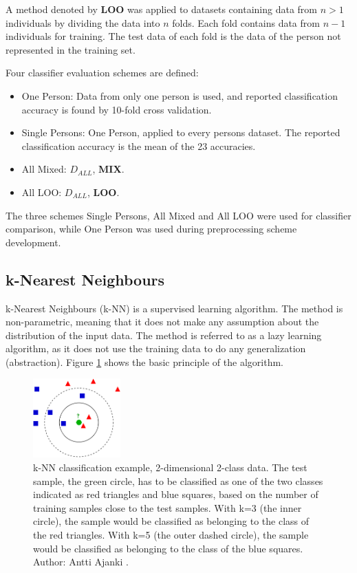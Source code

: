 A method denoted by \textbf{LOO} was applied to datasets
containing data from \(n>1\) individuals by dividing
the data into \(n\) folds. Each fold contains data from \(n-1\)
individuals for training. The test data of each fold is the
data of the person not represented in the training set.

Four classifier evaluation schemes are defined:
\begin{itemize}
\item One Person:
Data from only one person is used,
and reported classification accuracy is found by 10-fold cross validation.
\item Single Persons:
One Person, applied to every persons dataset. The reported
classification accuracy is the mean of the 23 accuracies.
\item All Mixed:
\(D_{ALL}\), \textbf{MIX}.
\item All LOO:
\(D_{ALL}\), \textbf{LOO}.
\end{itemize}
The three schemes Single Persons, All Mixed and All LOO
were used for classifier comparison,
while One Person was used during preprocessing
scheme development.

\subsection{k-Nearest Neighbours}
k-Nearest Neighbours (k-NN)
is a supervised learning algorithm.
The method is non-parametric,
meaning that it does not make any assumption about the distribution of the input data.
The method is referred to as a lazy learning algorithm,
as it does not use the training data to do any generalization (abstraction).
Figure \ref{fig:knn-example} \citep{knnwiki} shows the basic principle of the algorithm.
\begin{figure}[h]
\centering
\includegraphics[width = 0.3\textwidth]{img/kNN-classification.png}
\caption[k-NN classification example]{
k-NN classification example, 2-dimensional 2-class data.
The test sample, the green circle,
has to be classified as one of the two classes indicated
as red triangles and blue squares, based on the number
of training samples close to the test samples.
With k=3 (the inner circle), the sample would be classified as belonging
to the class of the red triangles.
With k=5 (the outer dashed circle), the sample would be classified as belonging
to the class of the blue squares.
Author: Antti Ajanki \citep{knnwiki}.
}
\label{fig:knn-example}
\end{figure}

